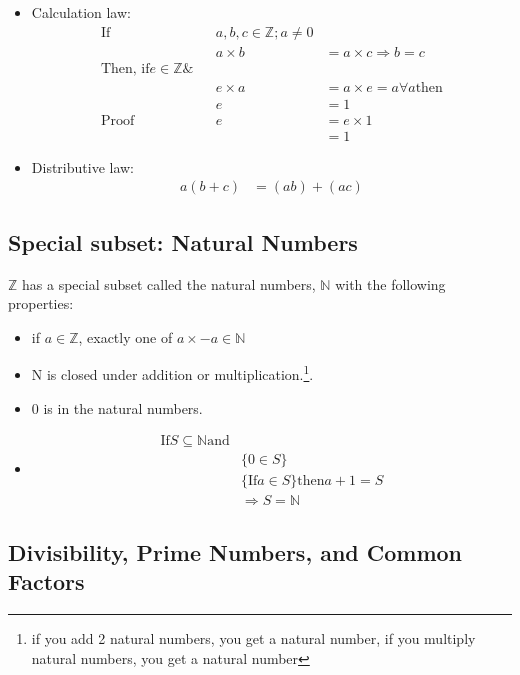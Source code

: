 \begin{itemize}
  \item Calculation law:
  \begin{align}
     \text{If} && a, b, c \in \mathbb{Z}; a \neq 0 \\
               && a \times b & = a \times c  \Rightarrow b = c \\
  \text{Then, if} e \in \mathbb{Z} \text{\&} \\
               && e \times a & = a \times e = a \forall a \text{then} \\
               &&          e & = 1 \\
  \text{Proof} && e & = e \times 1 \\
               &&   & = 1
  \end{align}
  \item Distributive law:
  \begin{align}
    a(b+c) & = (ab) + (ac)
  \end{align}
  
\end{itemize}
\subsection{Special subset: Natural Numbers}
$\mathbb{Z}$ has a special subset called the natural numbers, $\mathbb{N}$
with the following properties:
\begin{itemize}
  \item if $a \in \mathbb{Z}$, exactly one of $a \times -a \in \mathbb{N}$
  \item N is closed under addition or multiplication.\footnote{if you add 2
  natural numbers, you get a natural number, if you multiply natural numbers,
  you get a natural number}.
  \item $0$ is in the natural numbers.
  \item
  \begin{align}
    \text{If} S \subseteq \mathbb{N} \text{and} & \\
      & \{ 0 \in S \} \\
      & \{ \text{If} a \in S \} \text{then} a + 1 = S \\
      & \Rightarrow S = \mathbb{N}
   \end{align}
\end{itemize}

\subsection{Divisibility, Prime Numbers, and Common Factors}
\label{sec:DivisibilityPrimeNumbersAndCommonFactors}

